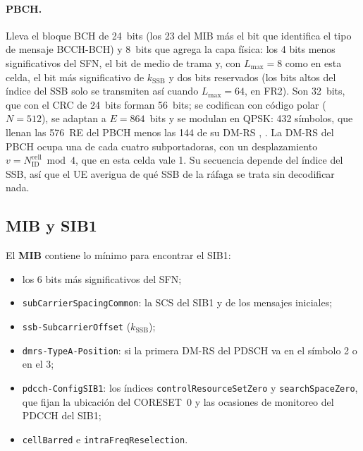 \paragraph{PBCH.} Lleva el bloque BCH de 24~bits (los 23 del MIB más el bit que identifica el tipo de mensaje BCCH-BCH) y 8~bits que agrega la capa física: los 4 bits menos significativos del SFN, el bit de medio de trama y, con $L_\text{max}=8$ como en esta celda, el bit más significativo de $k_\text{SSB}$ y dos bits reservados (los bits altos del índice del SSB solo se transmiten así cuando $L_\text{max}=64$, en FR2). Son 32~bits, que con el CRC de 24~bits forman 56~bits; se codifican con código polar ($N=512$), se adaptan a $E=864$~bits y se modulan en QPSK: 432 símbolos, que llenan las 576~RE del PBCH menos las 144 de su DM-RS \cite[§7.1.4 y §7.1.5]{ts38212}, \cite[tabla~7.4.3.1-1]{ts38211}. La DM-RS del PBCH ocupa una de cada cuatro subportadoras, con un desplazamiento $v = N_\text{ID}^\text{cell}\bmod 4$, que en esta celda vale 1. Su secuencia depende del índice del SSB, así que el UE averigua de qué SSB de la ráfaga se trata sin decodificar nada.

\subsection{MIB y SIB1}\label{sec:mib}
El \textbf{MIB} \cite[§6.2.2]{ts38331} contiene lo mínimo para encontrar el SIB1:
\begin{itemize}
  \item los 6 bits más significativos del SFN;
  \item \texttt{subCarrierSpacingCommon}: la SCS del SIB1 y de los mensajes iniciales;
  \item \texttt{ssb-SubcarrierOffset} ($k_\text{SSB}$);
  \item \texttt{dmrs-TypeA-Position}: si la primera DM-RS del PDSCH va en el símbolo 2 o en el 3;
  \item \texttt{pdcch-ConfigSIB1}: los índices \texttt{controlResourceSetZero} y \texttt{searchSpaceZero}, que fijan la ubicación del CORESET~0 y las ocasiones de monitoreo del PDCCH del SIB1;
  \item \texttt{cellBarred} e \texttt{intraFreqReselection}.
\end{itemize}

